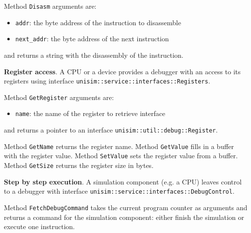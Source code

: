 \begin{center}
	
\end{center}

\noindent Method \texttt{Disasm} arguments are:
\begin{itemize}
\item \texttt{addr}: the byte address of the instruction to disassemble
\item \texttt{next\_addr}: the byte address of the next instruction
\end{itemize}
\noindent and returns a string with the disassembly of the instruction.

\textbf{Register access}. A CPU or a device provides a debugger with an access to its registers using interface \texttt{unisim::service::interfaces::Registers}.

\begin{center}
	
\end{center}

\noindent Method \texttt{GetRegister} arguments are:
\begin{itemize}
\item \texttt{name}: the name of the register to retrieve interface
\end{itemize}
\noindent and returns a pointer to an interface \texttt{unisim::util::debug::Register}.

\begin{center}
	
\end{center}

\noindent Method \texttt{GetName} returns the register name.
\noindent Method \texttt{GetValue} fills in a buffer with the register value.
\noindent Method \texttt{SetValue} sets the register value from a buffer.
\noindent Method \texttt{GetSize} returns the register size in bytes.

\textbf{Step by step execution}. A simulation component (e.g. a CPU) leaves control to a debugger with interface \texttt{unisim::service::interfaces::DebugControl}.

\begin{center}
	
\end{center}

Method \texttt{FetchDebugCommand} takes the current program counter as arguments and returns a command for the simulation component: either finish the simulation or execute one instruction.

